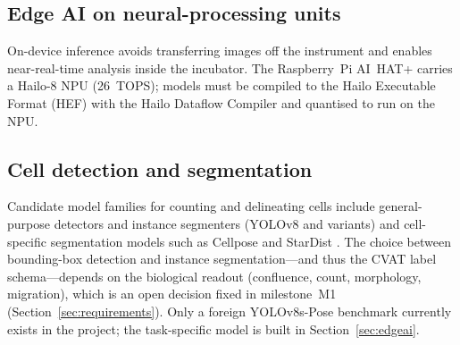 \subsection{Edge AI on neural-processing units}
On-device inference avoids transferring images off the instrument and enables
near-real-time analysis inside the incubator. The Raspberry~Pi AI~HAT+ carries a
Hailo-8 NPU (\SI{26}{TOPS}); models must be compiled to the Hailo Executable
Format (HEF) with the Hailo Dataflow Compiler and quantised to run on the NPU.

\subsection{Cell detection and segmentation}
Candidate model families for counting and delineating cells include
general-purpose detectors and instance segmenters (YOLOv8 and variants) and
cell-specific segmentation models such as Cellpose \cite{Stringer2021Cellpose}
and StarDist \cite{Schmidt2018StarDist}. The choice between bounding-box
detection and instance segmentation---and thus the CVAT label schema---depends
on the biological readout (confluence, count, morphology, migration), which is
an open decision fixed in milestone~M1
(Section~\ref{sec:requirements}). Only a foreign YOLOv8s-Pose benchmark
currently exists in the project; the task-specific model is built in
Section~\ref{sec:edgeai}.
